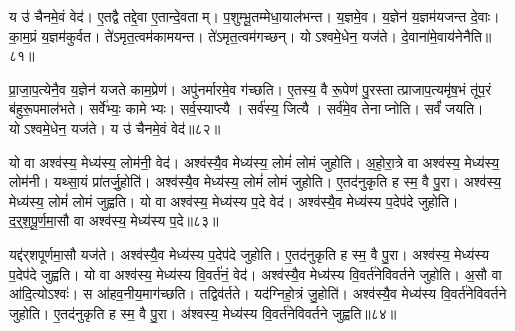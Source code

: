 य उ॑ चैनमे॒वं वेद॑।
ए॒तद्वै तद्दे॒वा ए॒तान्दे॒वताम्।
प॒शुम्भू॒तम्मेधा॒याल॑भन्त।
य॒ज्ञमे॒व।
य॒ज्ञेन॑ य॒ज्ञम॑यजन्त दे॒वाः।
का॒म॒प्रं य॒ज्ञम॑कुर्वत।
ते॑ऽमृत॒त्वम॑कामयन्त।
ते॑ऽमृत॒त्वम॑गच्छन्।
योऽश्वमे॒धेन॒ यज॑ते।
दे॒वाना॑मे॒वाय॑नेनैति॥८१॥

प्रा॒जा॒प॒त्येनै॒व य॒ज्ञेन॑ यजते काम॒प्रेण॑।
अपु॑नर्मारमे॒व ग॑च्छति।
ए॒तस्य॒ वै रू॒पेण॑ पु॒रस्तात्प्राजाप॒त्यमृ॑ष॒भं तू॑प॒रं ब॑हुरू॒पमाल॑भते।
सर्वे॑भ्यः॒ कामेभ्यः।
सर्व॒स्याप्त्यै।
सर्व॑स्य॒ जित्यै।
सर्व॑मे॒व तेनाप्नोति।
सर्वं॑ जयति।
योऽश्वमे॒धेन॒ यज॑ते।
य उ॑ चैनमे॒वं वेद॑॥८२॥\anuvakamend[मेधो\-ऽभ॑व॒द्यज॑त एति॒ वेद॑]

यो वा अश्व॑स्य॒ मेध्य॑स्य॒ लोम॑नी॒ वेद॑।
अश्व॑स्यै॒व मेध्य॑स्य॒ लोमं॑ लोमं जुहोति।
अ॒हो॒रा॒त्रे वा अश्व॑स्य॒ मेध्य॑स्य॒ लोम॑नी।
यथ्सा॒यं प्रा॑तर्जु॒होति॑।
अश्व॑स्यै॒व मेध्य॑स्य॒ लोमं॑ लोमं जुहोति।
ए॒तद॑नुकृति ह स्म॒ वै पु॒रा।
अश्व॑स्य॒ मेध्य॑स्य॒ लोमं॑ लोमं जुह्वति।
यो वा अश्व॑स्य॒ मेध्य॑स्य प॒दे वेद॑।
अश्व॑स्यै॒व मेध्य॑स्य प॒देप॑दे जुहोति।
द॒र्॒श॒पू॒र्ण॒मा॒सौ वा अश्व॑स्य॒ मेध्य॑स्य प॒दे॥८३॥

यद्द॑र्‌\mbox{}शपूर्णमा॒सौ यज॑ते।
अश्व॑स्यै॒व मेध्य॑स्य प॒देप॑दे जुहोति।
ए॒तद॑नुकृति ह स्म॒ वै पु॒रा।
अश्व॑स्य॒ मेध्य॑स्य प॒देप॑दे जुह्वति।
यो वा अश्व॑स्य॒ मेध्य॑स्य वि॒वर्त॑नं॒ वेद॑।
अश्व॑स्यै॒व मेध्य॑स्य वि॒वर्त॑नेविवर्तने जुहोति।
अ॒सौ वा आ॑दि॒त्यो\-ऽश्वः॑।
स आ॑हव॒नीय॒माग॑च्छति।
तद्विव॑र्तते।
यद॑ग्निहो॒त्रं जु॒होति॑।
अश्व॑स्यै॒व मेध्य॑स्य वि॒वर्त॑नेविवर्तने जुहोति।
ए॒तद॑नुकृति ह स्म॒ वै पु॒रा।
अ॑श्वस्य॒ मेध्य॑स्य वि॒वर्त॑नेविवर्तने जुह्वति॥८४॥\anuvakamend[प॒दे अ॑ग्निहो॒त्रं जु॒होति॒ त्रीणि॑ च]

\clearpage
